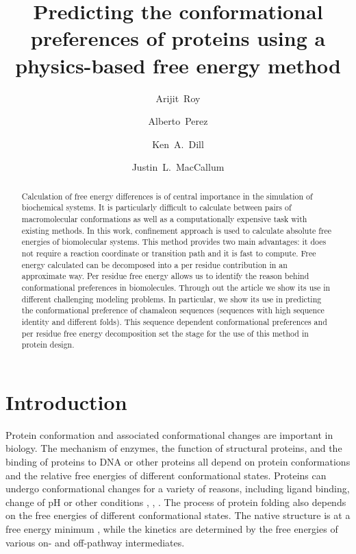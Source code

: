 \documentclass[12pt]{article}
\author{Arijit~Roy}
\author{Alberto~Perez}
\author{Ken~A.~Dill}
\author{Justin~L.~MacCallum}
\affil{Laufer Center for Physical and Quantitative Biology\\
    Stony Brook University\\
    Stony Brook, NY 11794-5252.}
\title{Predicting the conformational preferences of proteins using a physics-based free energy
method}
\begin{document}
\maketitle

\begin{abstract}

Calculation of free energy differences is of central importance in the simulation of biochemical
systems. It is particularly difficult to calculate between pairs of macromolecular conformations as
well as a computationally expensive task with existing methods. In this work, confinement approach
is used to calculate absolute free energies of biomolecular systems. This method provides two main
advantages: it does not require a reaction coordinate or transition path and it is fast to compute.
Free energy calculated can be decomposed into a per residue contribution in an approximate way. Per
residue free energy allows us to identify the reason behind conformational preferences in
biomolecules. Through out the article we show its use in different challenging modeling problems. In
particular, we show its use in predicting the conformational preference of chamaleon sequences
(sequences with high sequence identity and different folds). This sequence dependent conformational
preferences and per residue free energy decomposition set the stage for the use of this method in
protein design.

\end{abstract}


\section{Introduction}

Protein conformation and associated conformational changes are important in biology. The mechanism
of enzymes, the function of structural proteins, and the binding of proteins to DNA or other
proteins all depend on protein conformations and the relative free energies of different
conformational states. Proteins can undergo conformational changes for a variety of reasons,
including ligand binding, change of pH or other conditions \cite{Meirovitch2007}, \cite{Chipot2007},
\cite{Jorgensen2004}. The process of protein folding also depends on the free energies of different
conformational states. The native structure is at a free energy minimum \cite{Anfinsen1973}, while
the kinetics are determined by the free energies of various on- and off-pathway intermediates.
\end{document}
